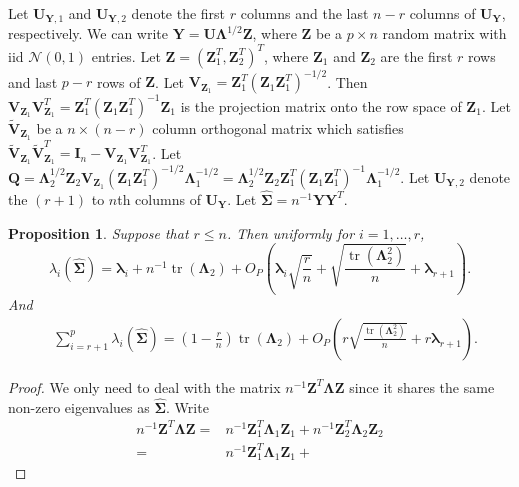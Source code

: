 \documentclass[12pt]{article} %
\DeclareMathOperator{\mytr}{tr}
\newcommand{\bQ}{\mathbf{Q}}
\newcommand{\bZ}{\mathbf{Z}}
\newcommand{\bY}{\mathbf{Y}}
\newcommand{\bI}{\mathbf{I}}
\newcommand{\bU}{\mathbf{U}}
\newcommand{\bV}{\mathbf{V}}
\newcommand{\bfsym}[1]{\ensuremath{\boldsymbol{#1}}}
\def\blambda {\bfsym {\lambda}}
\def\bLambda {\bfsym {\Lambda}}
\def\bSigma {\bfsym {\Sigma}}
\newtheorem{proposition}{Proposition}
\theoremstyle{definition}
\begin{document}
\begin{appendices}
Let $\bU_{\bY,1}$ and $\bU_{\bY,2}$ denote the first $r$ columns and the last $n-r$ columns of $\bU_{\bY}$, respectively.
We can write $\bY=\bU\bLambda^{1/2}\bZ$, where $\bZ$ be a $p\times n$ random matrix with iid $\mathcal{N}(0,1)$ entries.
    Let $\bZ =(\bZ_1^T,\bZ_2^T)^T$, where $\bZ_1$ and $\bZ_2$ are the first $r$ rows and last $p-r$ rows of $\bZ$.
    Let $\bV_{\bZ_1}=\bZ_1^T (\bZ_1 \bZ_1^T)^{-1/2}$.
    Then $\bV_{\bZ_1}\bV_{\bZ_1}^T=\bZ_1^T (\bZ_1 \bZ_1^T)^{-1}\bZ_1$ is the projection matrix onto the row space of $\bZ_1$.
    Let $\tilde{\bV}_{\bZ_1}$ be a $n\times (n-r)$ column orthogonal matrix which satisfies $\tilde{\bV}_{\bZ_1}\tilde{\bV}_{\bZ_1}^T= \bI_{n}-\bV_{\bZ_1}\bV_{\bZ_1}^T$.
    Let $
       \bQ=
       \bLambda_2^{1/2} \bZ_2 \bV_{\bZ_1} (\bZ_1 \bZ_1^T)^{-1/2} \bLambda_1^{-1/2}
       =
       \bLambda_2^{1/2} \bZ_2 \bZ_1^T (\bZ_1 \bZ_1^T)^{-1} \bLambda_1^{-1/2}
       $.
Let $\bU_{\bY,2}$ denote the $(r+1)$ to $n$th columns of $\bU_\bY$.
    Let $\hat{\bSigma}=n^{-1}\bY\bY^T$.
\begin{proposition}
    \label{eigenvalueProp}
    Suppose that $r\leq n$.
    Then uniformly for $i=1,\ldots, r$, 
\begin{equation}\label{eigenvalueProp:R1}
    \lambda_i(\hat{\bSigma})
        =
        \blambda_i
        +
        n^{-1}\mytr(\bLambda_2)
        +O_P\left(\blambda_i \sqrt{\frac{r}{n}}+\sqrt{\frac{\mytr(\bLambda_2^2)}{ n}}+\blambda_{r+1}\right).
    \end{equation}
And 
\begin{equation}\label{eigenvalueProp:R2}
    \begin{split}
     &\sum_{i=r+1}^p\lambda_i(\hat{\bSigma})
    =
    \left(1-\frac{r}{n}\right)\mytr(\bLambda_2)
    +O_P\left(r\sqrt{\frac{\mytr(\bLambda_2^2)}{ n}}+r\blambda_{r+1}\right)
    .
    \end{split}
\end{equation}
\end{proposition}
\begin{proof}
    We only need to deal with the matrix $n^{-1}\bZ^T \bLambda \bZ$ since it shares the same non-zero eigenvalues as $\hat{\bSigma}$.
    Write
    \begin{equation*}
        \begin{split}
        n^{-1}\bZ^T \bLambda \bZ=&
        n^{-1}\bZ_1^T \bLambda_1 \bZ_1+
        n^{-1}\bZ_2^T \bLambda_2 \bZ_2
        \\
        =&
        n^{-1}\bZ_1^T \bLambda_1 \bZ_1+

\end{split}
\end{equation*}
\end{proof}
\end{appendices}
\end{document}
